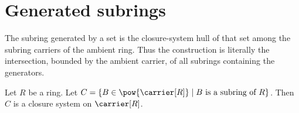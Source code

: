 


\section{Generated subrings}

The subring generated by a set is the closure-system hull of that set among
the subring carriers of the ambient ring.  Thus the construction is literally
the intersection, bounded by the ambient carrier, of all subrings containing
the generators.

\begin{proposition}\label{subring_carriers_form_closure_system}
    Let $R$ be a ring.
    Let
        $C=\{B\in\pow{\carrier[R]}\mid
            \text{$B$ is a subring of $R$}\}$.
    Then $C$ is a closure system on $\carrier[R]$.
\end{proposition}
